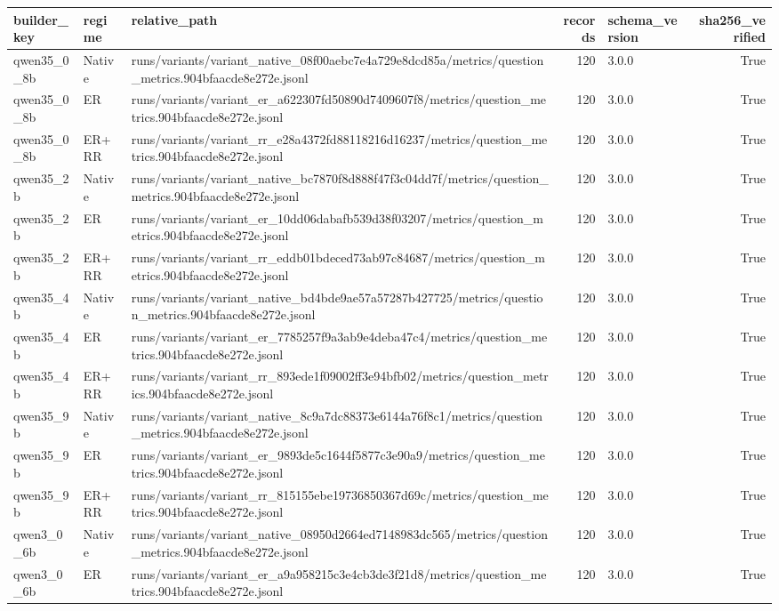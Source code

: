 \begin{tabular}{lllrlr}
\toprule
builder_key & regime & relative_path & records & schema_version & sha256_verified \\
\midrule
qwen35_0_8b & Native & runs/variants/variant_native_08f00aebc7e4a729e8dcd85a/metrics/question_metrics.904bfaacde8e272e.jsonl & 120 & 3.0.0 & True \\
qwen35_0_8b & ER & runs/variants/variant_er_a622307fd50890d7409607f8/metrics/question_metrics.904bfaacde8e272e.jsonl & 120 & 3.0.0 & True \\
qwen35_0_8b & ER+RR & runs/variants/variant_rr_e28a4372fd88118216d16237/metrics/question_metrics.904bfaacde8e272e.jsonl & 120 & 3.0.0 & True \\
qwen35_2b & Native & runs/variants/variant_native_bc7870f8d888f47f3c04dd7f/metrics/question_metrics.904bfaacde8e272e.jsonl & 120 & 3.0.0 & True \\
qwen35_2b & ER & runs/variants/variant_er_10dd06dabafb539d38f03207/metrics/question_metrics.904bfaacde8e272e.jsonl & 120 & 3.0.0 & True \\
qwen35_2b & ER+RR & runs/variants/variant_rr_eddb01bdeced73ab97c84687/metrics/question_metrics.904bfaacde8e272e.jsonl & 120 & 3.0.0 & True \\
qwen35_4b & Native & runs/variants/variant_native_bd4bde9ae57a57287b427725/metrics/question_metrics.904bfaacde8e272e.jsonl & 120 & 3.0.0 & True \\
qwen35_4b & ER & runs/variants/variant_er_7785257f9a3ab9e4deba47c4/metrics/question_metrics.904bfaacde8e272e.jsonl & 120 & 3.0.0 & True \\
qwen35_4b & ER+RR & runs/variants/variant_rr_893ede1f09002ff3e94bfb02/metrics/question_metrics.904bfaacde8e272e.jsonl & 120 & 3.0.0 & True \\
qwen35_9b & Native & runs/variants/variant_native_8c9a7dc88373e6144a76f8c1/metrics/question_metrics.904bfaacde8e272e.jsonl & 120 & 3.0.0 & True \\
qwen35_9b & ER & runs/variants/variant_er_9893de5c1644f5877c3e90a9/metrics/question_metrics.904bfaacde8e272e.jsonl & 120 & 3.0.0 & True \\
qwen35_9b & ER+RR & runs/variants/variant_rr_815155ebe19736850367d69c/metrics/question_metrics.904bfaacde8e272e.jsonl & 120 & 3.0.0 & True \\
qwen3_0_6b & Native & runs/variants/variant_native_08950d2664ed7148983dc565/metrics/question_metrics.904bfaacde8e272e.jsonl & 120 & 3.0.0 & True \\
qwen3_0_6b & ER & runs/variants/variant_er_a9a958215c3e4cb3de3f21d8/metrics/question_metrics.904bfaacde8e272e.jsonl & 120 & 3.0.0 & True \\

\end{tabular}
